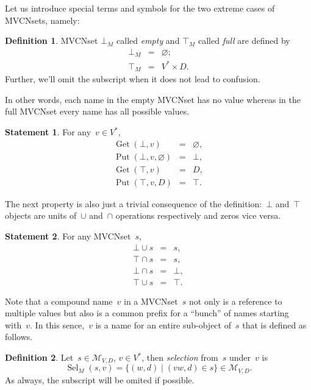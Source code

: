 \documentclass{article}
\theoremstyle{definition}
\newtheorem{Df}{Definition}
\newtheorem{St}{Statement}
\newcommand{\setcharmvcn}{M}
\newcommand{\setsymbol}[3]{\mathcal{#1}_{#2,#3}}
\newcommand{\setmvcn}[2]{\setsymbol{\setcharmvcn}{#1}{#2}}
\newcommand{\select}{\operatorname{Sel}}
\newcommand{\deref}{\operatorname{Get}}
\newcommand{\putval}{\operatorname{Put}}
\begin{document}
Let us introduce special terms and symbols for the two extreme cases of
MVCNsets, namely:
\begin{Df}\label{df:mvcn-extreme}
MVCNset $\bot_\setcharmvcn$ called \emph{empty} and $\top_\setcharmvcn$ called
\emph{full} are defined by
\begin{eqnarray*}
  \bot_\setcharmvcn &  = &  \varnothing ; \\
  \top_\setcharmvcn &  = &  V^\ast \times D .
\end{eqnarray*}
Further, we'll omit the subscript when it does not lead to confusion.
\end{Df}

In other words, each name in the empty MVCNset has no value whereas in the
full MVCNset every name has all possible values.
\begin{St}\label{st:mvcn-extreme-deref}
For any~$v\in V^\ast$,
\begin{eqnarray*}
  \deref(\bot, v) & = & \varnothing, \\
  \putval(\bot, v, \varnothing) & = & \bot , \\
  \deref(\top, v) & = & D , \\
  \putval(\top, v, D) & = & \top .
\end{eqnarray*}
\end{St}

The next property is also just a trivial consequence of the definition:~$\bot$
and~$\top$ objects are units of~$\cup$ and~$\cap$ operations respectively and
zeros vice versa.
\begin{St}\label{st:mvcn-neutrals}
For any MVCNset~$s$,
\begin{eqnarray*}
  \bot \cup s & = & s,    \\
  \top \cap s & = & s,    \\
  \bot \cap s & = & \bot, \\
  \top \cup s & = & \top.
\end{eqnarray*}
\end{St}

Note that a compound name~$v$ in a MVCNset~$s$ not only is a reference to
multiple values but also is a common prefix for a ``bunch'' of names starting
with~$v$. In this sence,~$v$ is a name for an entire sub-object of~$s$ that is
defined as follows.
\begin{Df}\label{df:mvcn-select}
Let~$s\in\setmvcn{V}{D}$, $v\in V^\ast$, then \emph{selection} from~$s$
under~$v$ is
\[
  \select_\setcharmvcn(s,v) = \{ (w, d) \mid (vw, d)\in s \} \in\setmvcn{V}{D}.
\]
As always, the subscript will be omited if possible.
\end{Df}
\end{document}
